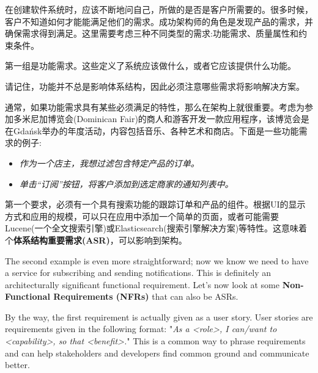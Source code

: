 
在创建软件系统时，应该不断地问自己，所做的是否是客户所需要的。很多时候，客户不知道如何才能能满足他们的需求。成功架构师的角色是发现产品的需求，并确保需求得到满足。这里需要考虑三种不同类型的需求:功能需求、质量属性和约束条件。


第一组是功能需求。这些定义了系统应该做什么，或者它应该提供什么功能。

\begin{tcolorbox}[colback=webgreen!5!white,colframe=webgreen!75!black, title=TIP]
\hspace*{0.7cm}请记住，功能并不总是影响体系结构，因此必须注意哪些需求将影响解决方案。
\end{tcolorbox}

通常，如果功能需求具有某些必须满足的特性，那么在架构上就很重要。考虑为参加多米尼加博览会(Dominican Fair)的商人和游客开发一款应用程序，该博览会是在Gdańsk举办的年度活动，内容包括音乐、各种艺术和商店。下面是一些功能需求的例子:

\begin{itemize}
\item 
\textit{作为一个店主，我想过滤包含特定产品的订单。}

\item 
\textit{单击“订阅”按钮，将客户添加到选定商家的通知列表中。}
\end{itemize}

第一个要求，必须有一个具有搜索功能的跟踪订单和产品的组件。根据UI的显示方式和应用的规模，可以只在应用中添加一个简单的页面，或者可能需要Lucene(一个全文搜索引擎)或Elasticsearch(搜索引擎解决方案)等特性。这意味着个\textbf{体系结构重要需求(ASR)}，可以影响到架构。

The second example is even more straightforward; now we know we need to have a service for subscribing and sending notifications. This is definitely an architecturally significant functional requirement. Let's now look at some \textbf{Non-Functional Requirements (NFRs)} that can also be ASRs.

By the way, the first requirement is actually given as a user story. User stories are requirements given in the following format: "\textit{As a <role>, I can/want to <capability>, so that <benefit>.}" This is a common way to phrase requirements and can help stakeholders and developers find common ground and communicate better.


